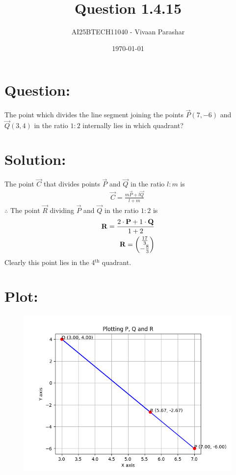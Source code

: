 \documentclass[a4paper, 12pt]{article}
\title{Question 1.4.15}
\author{AI25BTECH11040 - Vivaan Parashar}
\date{\today}
\begin{document}
\maketitle

\section{Question: }
The point which divides the line segment joining the points $\vec{P}(7, -6)$ and $\vec{Q}(3, 4)$ in the ratio $1 : 2$ internally lies in which quadrant?

\section{Solution: }
The point $\vec{C}$ that divides points $\vec{P}$ and $\vec{Q}$ in the ratio $l : m$ is
\begin{align}
    \vec{C} = \frac{m\vec{P} + l\vec{Q}}{l+m}\
\end{align}
$\therefore$ The point $\vec{R}$ dividing $\vec{P}$ and $\vec{Q}$ in the ratio $1:2$ is
\begin{align}
    \mathbf{R} = \frac{2\cdot\mathbf{P}+1\cdot\mathbf{Q}}{1+2}\\
    \mathbf{R} = \begin{pmatrix}\frac{17}{3} \\ -\frac{8}{3}\end{pmatrix}
\end{align}
Clearly this point lies in the 4$^\text{th}$ quadrant.

\pagebreak
\section{Plot: }
\begin{figure}[H]
    \includegraphics[scale=1]{figs/plot.png}
\end{figure}
\end{document}
